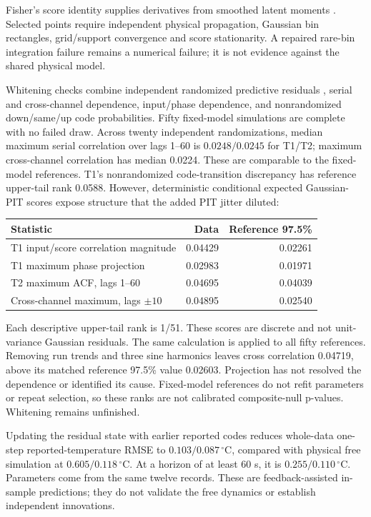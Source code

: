 \documentclass[10pt,letterpaper]{article}
\newcommand{\C}{\,^\circ\mathrm{C}}
\begin{document}
Fisher's score identity supplies derivatives from smoothed latent moments
\cite{poyiadjis2011}. Selected points require independent physical propagation,
Gaussian bin rectangles, grid/support convergence and score stationarity.
A repaired rare-bin integration failure remains a numerical failure;
it is not evidence against the shared physical model.

Whitening checks combine independent randomized predictive residuals
\cite{dunn1996}, serial and cross-channel dependence, input/phase dependence,
and nonrandomized down/same/up code probabilities. Fifty fixed-model
simulations are complete with no failed draw. Across twenty independent
randomizations, median maximum serial correlation over lags 1--60 is
$0.0248/0.0245$ for T1/T2; maximum cross-channel correlation has median 0.0224.
These are comparable to the fixed-model references. T1's nonrandomized
code-transition discrepancy has reference upper-tail rank 0.0588.
However, deterministic conditional expected Gaussian-PIT scores expose
structure that the added PIT jitter diluted:
\begin{center}
\begin{tabular}{@{}lrr@{}}
\toprule
Statistic & Data & Reference 97.5\%\\
\midrule
T1 input/score correlation magnitude & 0.04429 & 0.02261\\
T1 maximum phase projection & 0.02983 & 0.01971\\
T2 maximum ACF, lags 1--60 & 0.04695 & 0.04039\\
Cross-channel maximum, lags $\pm10$ & 0.04895 & 0.02540\\
\bottomrule
\end{tabular}
\end{center}
Each descriptive upper-tail rank is 1/51. These scores are discrete and
not unit-variance Gaussian residuals. The same calculation is applied to all
fifty references. Removing run trends and three sine harmonics leaves cross
correlation 0.04719, above its matched reference 97.5\% value 0.02603.
Projection has not resolved the dependence or identified its cause.
Fixed-model references do not refit parameters or repeat selection, so these
ranks are not calibrated composite-null p-values. Whitening remains unfinished.

Updating the residual state with earlier reported codes reduces whole-data
one-step reported-temperature RMSE to $0.103/0.087\C$, compared with physical
free simulation at $0.605/0.118\C$. At a horizon of at least 60 s, it is
$0.255/0.110\C$. Parameters come from the same twelve records. These are
feedback-assisted in-sample predictions; they do not validate the free dynamics
or establish independent innovations.
\end{document}
